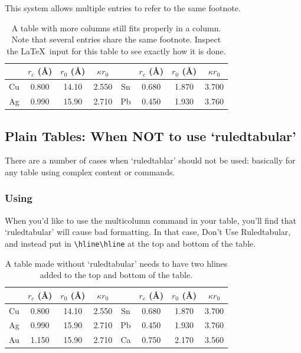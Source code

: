 \documentclass[reprint,NumberedRefs]{JASAnew}
\begin{document}
This system allows
multiple entries to refer to the same
footnote.   


\begin{table}[ht]
\caption{\label{tab:table1}A table with more columns still fits
properly in a column. Note that several entries share the same
footnote. Inspect the \LaTeX\ input for this table to see
exactly how it is done.}

\begin{ruledtabular}
\begin{tabular}{cccccccc}
 &$r_c$ (\AA)\footnotemark[1]&$r_0$ (\AA)&$\kappa r_0$&
 &$r_c$ (\AA) &$r_0$ (\AA)&$\kappa r_0$\\
\hline
Cu& 0.800 & 14.10 & 2.550 &Sn\footnotemark[1]
& 0.680 & 1.870 & 3.700 \\
Ag& 0.990 & 15.90 & 2.710 &Pb\footnotemark[2]
& 0.450 & 1.930 & 3.760 \\
\end{tabular}
\end{ruledtabular}
\end{table}
\clearpage
\subsection{Plain Tables: When NOT to use `ruledtabular'}
There are a number of cases when `ruledtablar' should not
be used: basically for any table using complex content or 
commands.

\subsubsection{Using {\tt\string\multicolumn}}
When you'd like to use the multicolumn command in your
table, you'll find that `ruledtabular' will cause bad
formatting. In that case, Don't Use Ruledtabular, and
instead put in \verb+\hline\hline+ at the top and bottom of
the table. 


\begin{table}[ht]
\caption{A table made without `ruledtabular' needs to have two hlines
added to the top and bottom of the table.}
\vskip3pt
\begin{tabular}{cccccccc}
\hline\hline
 &$r_c$ (\AA)\footnotemark[1]&$r_0$ (\AA)&$\kappa r_0$&
 &$r_c$ (\AA) &$r_0$ (\AA)&$\kappa r_0$\\
\hline
Cu& 0.800 & 14.10 & 2.550 &Sn\footnotemark[1]
& 0.680 & 1.870 & 3.700 \\
Ag& 0.990 & 15.90 & 2.710 &Pb\footnotemark[2]
& 0.450 & 1.930 & 3.760 \\
Au& 1.150 & 15.90 & 2.710 &Ca\footnotemark[3]
& 0.750 & 2.170 & 3.560\\
\hline\hline
\end{tabular}
\end{table}
\end{document}
